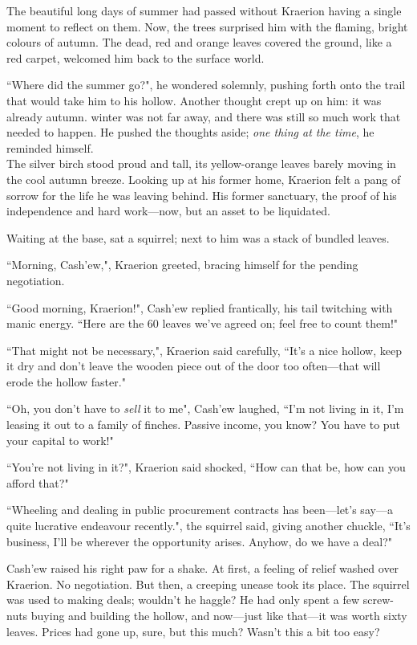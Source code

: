 The beautiful long days of summer had passed without Kraerion having a single moment to reflect on them. Now, the trees surprised him with the flaming, bright colours of autumn. The dead, red and orange leaves covered the ground, like a red carpet, welcomed him back to the surface world.

``Where did the summer go?", he wondered solemnly, pushing forth onto the trail that would take him to his hollow. Another thought crept up on him: it was already autumn. winter was not far away, and there was still so much work that needed to happen. He pushed the thoughts aside; \textit{one thing at the time}, he reminded himself.\\

The silver birch stood proud and tall, its yellow-orange leaves barely moving in the cool autumn breeze. Looking up at his former home, Kraerion felt a pang of sorrow for the life he was leaving behind. His former sanctuary, the proof of his independence and hard work---now, but an asset to be liquidated.

Waiting at the base, sat a squirrel; next to him was a stack of bundled leaves.

``Morning, Cash'ew,", Kraerion greeted, bracing himself for the pending negotiation.

``Good morning, Kraerion!", Cash'ew replied frantically, his tail twitching with manic energy. ``Here are the 60 leaves we've agreed on; feel free to count them!"

``That might not be necessary,", Kraerion said carefully, ``It's a nice hollow, keep it dry and don't leave the wooden piece out of the door too often---that will erode the hollow faster."

``Oh, you don't have to \textit{sell} it to me", Cash'ew laughed, ``I'm not living in it, I'm leasing it out to a family of finches. Passive income, you know? You have to put your capital to work!"

``You're not living in it?", Kraerion said shocked, ``How can that be, how can you afford that?"

``Wheeling and dealing in public procurement contracts has been---let's say---a quite lucrative endeavour recently.", the squirrel said, giving another chuckle, ``It's business, I'll be wherever the opportunity arises. Anyhow, do we have a deal?"

Cash'ew raised his right paw for a shake.
At first, a feeling of relief washed over Kraerion. No negotiation. But then, a creeping unease took its place. The squirrel was used to making deals; wouldn't he haggle?
He had only spent a few screw-nuts buying and building the hollow, and now---just like that---it was worth sixty leaves. Prices had gone up, sure, but this much? Wasn't this a bit too easy?

